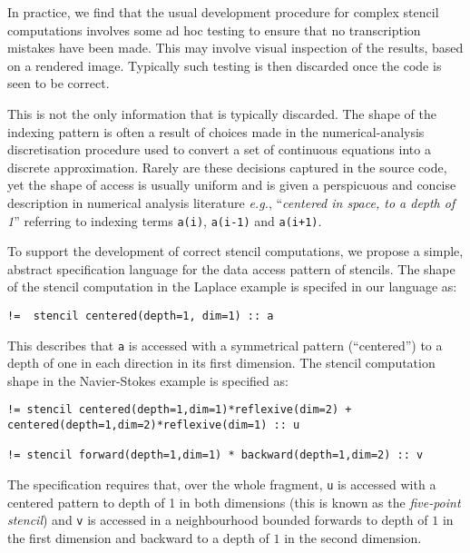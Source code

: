 \documentclass[9pt,preprint]{sigplanconf}
\theoremstyle{definition}
\newcommand{\eg}{\emph{e.g.}}
\begin{document}
In practice, we find that the usual development procedure for complex
stencil computations involves some ad hoc testing to ensure that no
transcription mistakes have been made. This may involve visual
inspection of the results, based on a rendered image. Typically such
testing is then discarded once the code is seen to be correct.

This is not the only information that is typically discarded. The
shape of the indexing pattern is often a result of choices made in the
numerical-analysis discretisation procedure used to convert a set of
continuous equations into a discrete approximation. Rarely are these
decisions captured in the source code, yet the shape of access is
usually uniform and is given a perspicuous and concise description in
numerical analysis literature \eg{}, ``\emph{centered in space, to a
  depth of 1}'' referring to indexing terms \texttt{a(i)},
\texttt{a(i-1)} and \texttt{a(i+1)}.

To support the development of correct stencil computations, we propose
a simple, abstract specification language for the data access pattern
of stencils. The shape of the stencil computation in the
Laplace example is specifed in our language as:
%
\begin{verbatim}
!=  stencil centered(depth=1, dim=1) :: a
\end{verbatim}
%
This describes that \texttt{a} is accessed with a symmetrical pattern
(``centered'') to a depth of one in each direction in its first
dimension.  The stencil computation shape in the Navier-Stokes example
is specified as:
%
\begin{verbatim}
!= stencil centered(depth=1,dim=1)*reflexive(dim=2) + centered(depth=1,dim=2)*reflexive(dim=1) :: u

!= stencil forward(depth=1,dim=1) * backward(depth=1,dim=2) :: v
\end{verbatim}
%
The specification requires that, over the whole fragment, \texttt{u}
is accessed with a centered pattern to depth of 1 in both dimensions
(this is known as the \emph{five-point stencil}) and \texttt{v} is
accessed in a neighbourhood bounded forwards to depth of $1$ in the
first dimension and backward to a depth of $1$ in the second
dimension.
\end{document}
